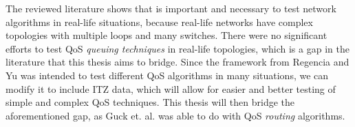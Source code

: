 The reviewed literature shows that is important and necessary to test network algorithms in real-life situations, because real-life networks have complex topologies with multiple loops and many switches. There were no significant efforts to test QoS \textit{queuing techniques} in real-life topologies, which is a gap in the literature that this thesis aims to bridge. Since the framework from Regencia and Yu was intended to test different QoS algorithms in many situations, we can modify it to include ITZ data, which will allow for easier and better testing of simple and complex QoS techniques. This thesis will then bridge the aforementioned gap, as Guck et. al. \cite{guck_unicast_2018} was able to do with QoS \textit{routing} algorithms.
